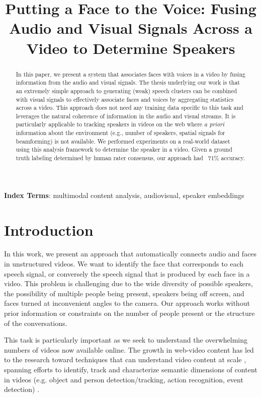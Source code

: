 \documentclass[a4paper]{article}
\title{Putting a Face to the Voice: Fusing Audio and Visual Signals Across a Video to Determine Speakers}
\begin{document}
\ninept
\maketitle
% 
\begin{abstract}
In this paper, we present a system that associates faces with voices in a video by fusing information from the audio and visual signals. The thesis underlying our work is that an extremely simple approach to generating (weak) speech clusters can be combined with visual signals to effectively associate faces and voices by aggregating statistics across a video. This approach does not need any training data specific to this task and leverages the natural coherence of information in the audio and visual streams. It is particularly applicable to tracking speakers in videos on the web where {\it a priori} information about the environment (e.g., number of speakers, spatial signals for beamforming) is not available. We performed experiments on a real-world dataset using this analysis framework to determine the speaker in a video. Given a ground truth labeling determined by human rater consensus, our approach had ~71\% accuracy.
\end{abstract}
\noindent\textbf{Index Terms}: multimodal content analysis, audiovisual, speaker embeddings

\section{Introduction}
\label{sec:intro}

In this work, we present an approach that automatically connects audio and faces in unstructured videos. We want to identify the face that corresponds to each speech signal, or conversely the speech signal that is produced by each face in a video. This problem is challenging due to the wide diversity of possible speakers, the possibility of multiple people being present, speakers being off screen, and faces turned at inconvenient angles to the camera. Our approach works without prior information or constraints on the number of people present or the structure of the conversations.

This task is particularly important as we seek to understand the overwhelming numbers of videos now available online. The growth in web-video content has led to the research toward techniques that can understand video content at scale \cite{Ton14, Abu16, Her17}, spanning efforts to identify, track and characterize semantic dimensions of content in videos (e.g. object and person detection/tracking, action recognition, event detection) \cite{Sar09,Geb15,Sch15}.
\end{document}
